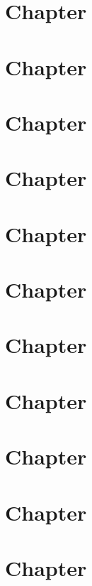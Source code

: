 \documentclass[a4paper,10pt]{book}
\begin{document}
\chapter{Chapter}\label{Chap29}
\chapter{Chapter}\label{Chap30}
\chapter{Chapter}\label{Chap31}
\chapter{Chapter}\label{Chap32}
\chapter{Chapter}\label{Chap33}
\chapter{Chapter}\label{Chap34}
\chapter{Chapter}\label{Chap35}
\chapter{Chapter}\label{Chap36}
\chapter{Chapter}\label{Chap37}
\chapter{Chapter}\label{Chap38}
\chapter{Chapter}\label{Chap39}
\end{document}
